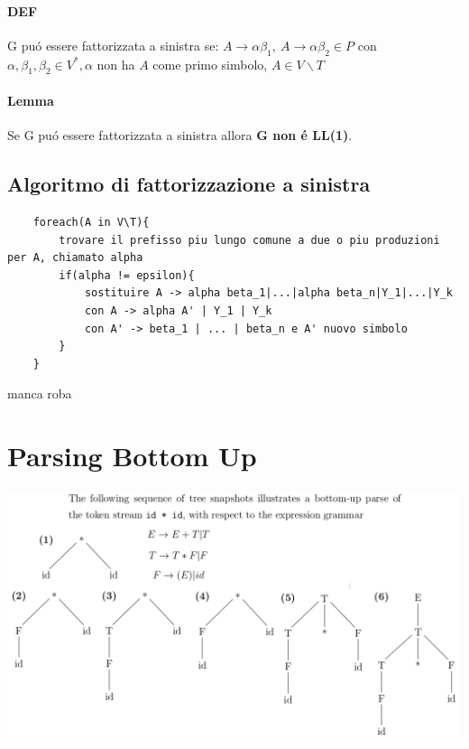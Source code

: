 \subsubsection{DEF}
G pu\'o essere fattorizzata a sinistra se:
$A \rightarrow \alpha \beta _1,\ A \rightarrow \alpha\beta _2 \in P$ con \\
$\alpha , \beta _1, \beta _2 \in V^*, \alpha $ non ha $A$ come primo simbolo, $A \in V\backslash T$

\subsubsection{Lemma}
Se G pu\'o essere fattorizzata a sinistra allora \textbf{G non \'e LL(1)}.

\section{Algoritmo di fattorizzazione a sinistra}
\begin{lstlisting}
    foreach(A in V\T){
        trovare il prefisso piu lungo comune a due o piu produzioni per A, chiamato alpha 
        if(alpha != epsilon){
            sostituire A -> alpha beta_1|...|alpha beta_n|Y_1|...|Y_k
            con A -> alpha A' | Y_1 | Y_k 
            con A' -> beta_1 | ... | beta_n e A' nuovo simbolo
        }
    }
\end{lstlisting}

manca roba

\chapter{Parsing Bottom Up}

\begin{center}
    \includegraphics[scale=0.4]{Chapters/Img/c04_02.png}\\
\end{center}

